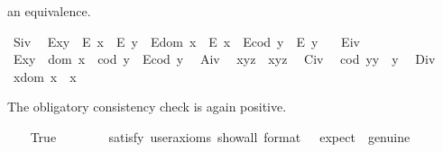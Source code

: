 \begin{isabellebody}
\begin{isamarkuptext}
 an equivalence.%
\end{isamarkuptext}\isamarkuptrue%
\ S\isactrlsub i\isactrlsub v{\isacharcolon}\ %
\ {\isachardoublequoteopen}{\isacharparenleft}E{\isacharparenleft}x{\isasymcdot}y{\isacharparenright}\ \isactrlbold {\isasymrightarrow}\ {\isacharparenleft}E\ x\ \isactrlbold {\isasymand}\ E\ y{\isacharparenright}{\isacharparenright}\ \isactrlbold {\isasymand}\ {\isacharparenleft}E{\isacharparenleft}dom\ x{\isacharparenright}\ \isactrlbold {\isasymrightarrow}\ E\ x{\isacharparenright}\ \isactrlbold {\isasymand}\ {\isacharparenleft}E{\isacharparenleft}cod\ y{\isacharparenright}\ \isactrlbold {\isasymrightarrow}\ E\ y{\isacharparenright}{\isachardoublequoteclose}\ \ \isanewline
\ E\isactrlsub i\isactrlsub v{\isacharcolon}\ %
\ {\isachardoublequoteopen}E{\isacharparenleft}x{\isasymcdot}y{\isacharparenright}\ \isactrlbold {\isasymleftrightarrow}\ {\isacharparenleft}dom\ x\ {\isasymcong}\ cod\ y\ \isactrlbold {\isasymand}\ E{\isacharparenleft}cod\ y{\isacharparenright}{\isacharparenright}{\isachardoublequoteclose}\ \isanewline
\ A\isactrlsub i\isactrlsub v{\isacharcolon}\ %
\ {\isachardoublequoteopen}x{\isasymcdot}{\isacharparenleft}y{\isasymcdot}z{\isacharparenright}\ {\isasymcong}\ {\isacharparenleft}x{\isasymcdot}y{\isacharparenright}{\isasymcdot}z{\isachardoublequoteclose}\ \isanewline
\ C\isactrlsub i\isactrlsub v{\isacharcolon}\ %
\ {\isachardoublequoteopen}{\isacharparenleft}cod\ y{\isacharparenright}{\isasymcdot}y\ {\isasymcong}\ y{\isachardoublequoteclose}\ \isanewline
\ D\isactrlsub i\isactrlsub v{\isacharcolon}\ %
\ {\isachardoublequoteopen}x{\isasymcdot}{\isacharparenleft}dom\ x{\isacharparenright}\ {\isasymcong}\ x{\isachardoublequoteclose}%
\begin{isamarkuptext}%
The obligatory consistency check is again positive.%
\end{isamarkuptext}\isamarkuptrue%
\ \ \isamarkupfalse%
\ True\ \ %
\isanewline
\ \ \ \ \isamarkupfalse%
\ {\isacharbrackleft}satisfy{\isacharcomma}\ user{\isacharunderscore}axioms{\isacharcomma}\ show{\isacharunderscore}all{\isacharcomma}\ format\ {\isacharequal}\ {}{\isacharcomma}\ expect\ {\isacharequal}\ genuine{\isacharbrackright}%
\isadelimproof

\end{isabellebody}

